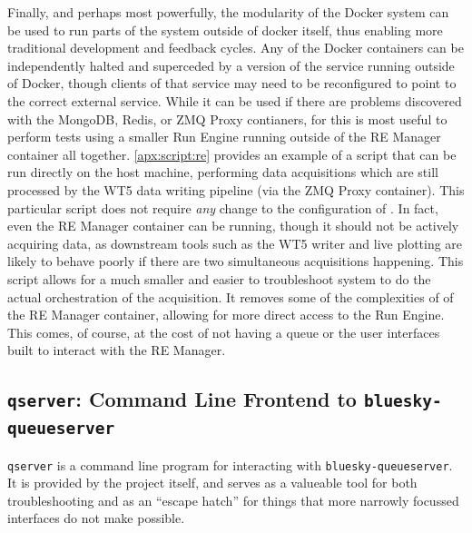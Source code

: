 Finally, and perhaps most powerfully, the modularity of the Docker system can be used to run parts of the system outside of docker itself, thus enabling more traditional development and feedback cycles.
Any of the Docker containers can be independently halted and superceded by a version of the service running outside of Docker, though clients of that service may need to be reconfigured to point to the correct external service.
While it can be used if there are problems discovered with the MongoDB, Redis, or ZMQ Proxy contianers, for \biab this is most useful to perform tests using a smaller Run Engine running outside of the RE Manager container all together.
\ref{apx:script:re} provides an example of a script that can be run directly on the host machine, performing data acquisitions which are still processed by the WT5 data writing pipeline (via the ZMQ Proxy container).
This particular script does not require \textit{any} change to the configuration of \biab.
In fact, even the RE Manager container can be running, though it should not be actively acquiring data, as downstream tools such as the WT5 writer and live plotting are likely to behave poorly if there are two simultaneous acquisitions happening.
This script allows for a much smaller and easier to troubleshoot system to do the actual orchestration of the acquisition.
It removes some of the complexities of of the RE Manager container, allowing for more direct access to the Run Engine.
This comes, of course, at the cost of not having a queue or the user interfaces built to interact with the RE Manager.







\subsection{\texttt{qserver}: Command Line Frontend to \texttt{bluesky-queueserver}}

\texttt{qserver} is a command line program for interacting with \texttt{bluesky-queueserver}.
It is provided by the project itself, and serves as a valueable tool for both troubleshooting and as an ``escape hatch'' for things that more narrowly focussed interfaces do not make possible.

